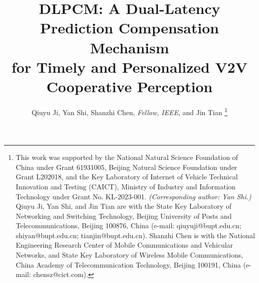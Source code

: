 \documentclass[lettersize,journal]{IEEEtran}
\begin{document}
\title{DLPCM: A Dual-Latency Prediction Compensation Mechanism \\for Timely and Personalized V2V Cooperative Perception
}

\author{Qiuyu Ji, Yan Shi, Shanzhi Chen, \textit{Fellow, IEEE}, and Jin Tian
\thanks{
This work was supported by the National Natural Science Foundation of China under Grant 61931005, Beijing Natural Science Foundation under Grant L202018, and the Key Laboratory of Internet of Vehicle Technical Innovation and Testing (CAICT), Ministry of Industry and Information Technology under Grant No. KL-2023-001. \textit{(Corresponding author: Yan Shi.)}
Qiuyu Ji, Yan Shi, and Jin Tian are with the State Key Laboratory of Networking and Switching Technology, Beijing University of Posts and Telecommunications, Beijing 100876, China (e-mail: qiuyuji@bupt.edu.cn; shiyan@bupt.edu.cn; tianjin@bupt.edu.cn).
Shanzhi Chen is with the National Engineering Research Center of Mobile Communications and Vehicular Networks, and State Key Laboratory of Wireless Mobile Communications, China Academy of Telecommunication Technology, Beijing 100191, China (e-mail: chensz@cict.com).


}}



\maketitle
\end{document}
